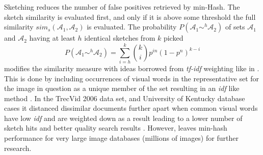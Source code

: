 \documentclass[english,12pt,a4paper,pdftex,elec,utf8, table]{aaltothesis}
\begin{document}
Sketching reduces the number of false positives retrieved by min-Hash. The sketch similarity is evaluated first, and only if it is above some threshold the full similarity $sim_s(\mathcal{A}_1, \mathcal{A}_2)$ is evaluated. The probability $P(\mathcal{A}_1 \sim^h \mathcal{A}_2)$ of sets $\mathcal{A}_1$ and $\mathcal{A}_2$ having at least $h$ identical sketches from $k$ picked
\begin{equation} \label{sketchsimilarityprob}
P(\mathcal{A}_1 \sim^h \mathcal{A}_2) = \sum_{i=h}^k \binom{k}{i} p^{in}(1-p^n)^{k-i}
\end{equation}
\cite{Chum2008} modifies the similarity measure with ideas borrowed from \emph{tf-idf} weighting like in \cite{Sivic2003}. This is done by including occurrences of visual words in the representative set for the image in question as a unique member of the set resulting in an \emph{idf} like method \cite{Chum2010}. In the TrecVid 2006 data set, and University of Kentucky database cases it distanced dissimilar documents further apart when common visual words have low \emph{idf} and are weighted down as a result leading to a lower number of sketch hits and better quality search results \cite{Chum2008}. However, \cite{Chum2008} leaves min-hash performance for very large image databases (millions of images) for further research.
\end{document}
